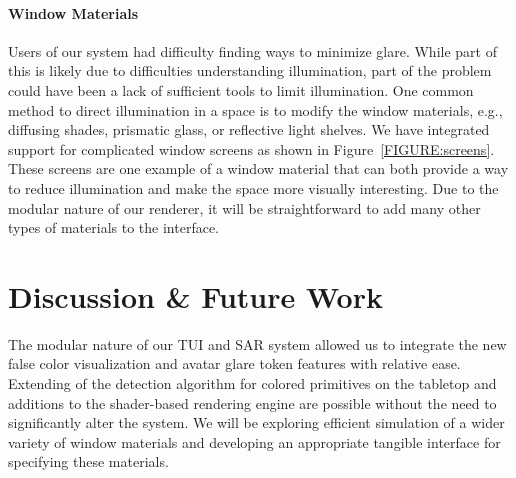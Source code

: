 \documentclass[10pt,twocolumn,letterpaper]{article}
\begin{document}

\vspace{-0.1in}
\paragraph{Window Materials}

Users of our system had difficulty finding ways to minimize glare.  
While part of this is likely due to difficulties understanding illumination,
part of the problem could have been a lack of sufficient tools to 
limit illumination.  
%
One common method to direct illumination in a space is to modify the
window materials, e.g., diffusing shades, prismatic glass, or
reflective light shelves.  We have integrated support for complicated
window screens as shown in Figure~\ref{FIGURE:screens}.  These screens
are one example of a window material that can both provide a way to
reduce illumination and make the space more visually interesting.  Due
to the modular nature of our renderer, it will be straightforward to
add many other types of materials to the interface.


\section{Discussion \& Future Work}

The modular nature of our TUI and SAR system allowed us to integrate
the new false color visualization and avatar glare token features with
relative ease.  Extending of the detection algorithm for colored
primitives on the tabletop and additions to the shader-based rendering
engine are possible
without the need to significantly alter the system.
%
We will be exploring efficient simulation of a wider variety of window materials
and developing an appropriate tangible interface for specifying these materials.
\end{document}
